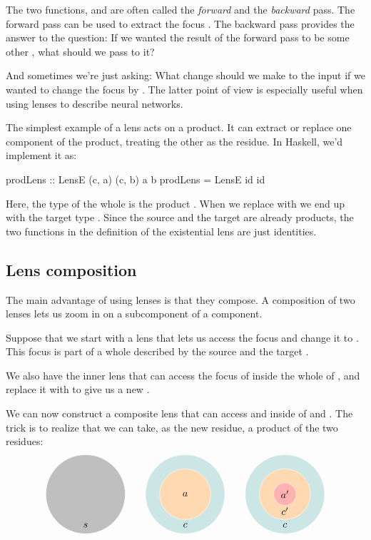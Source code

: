 \documentclass[DaoFP]{subfiles}
\begin{document}
The two functions,  and  are often called the \emph{forward} and the \emph{backward} pass. 
The forward pass can be used to extract the focus . The backward pass provides the answer to the question: If we wanted the result of the forward pass to be some other , what  should we pass to it? 

And sometimes we're just asking: What change  should we make to the input if we wanted to change the focus by . The latter point of view is especially useful when using lenses to describe neural networks.

The simplest example of a lens acts on a product. It can extract or replace one component of the product, treating the other as the residue. In Haskell, we'd implement it as:
\begin{haskell}
prodLens :: LensE (c, a) (c, b) a b
prodLens = LensE id id
\end{haskell}
Here, the type of the whole is the product . When we replace  with  we end up with the target type . Since the source and the target are already products, the two functions in the definition of the existential lens are just identities.

\subsection{Lens composition}

The main advantage of using lenses is that they compose. A composition of two lenses lets us zoom in on a subcomponent of a component. 

Suppose that we start with a lens that lets us access the focus   and change it to . This focus is part of a whole described by the source  and the target . 

We also have the inner lens that can access the focus of   inside the whole of , and replace it with  to give us a new . 

We can now construct a composite lens that can access  and  inside of  and . The trick is to realize that we can take, as the new residue, a product of the two residues:
\[
\begin{tikzpicture}
\filldraw[fill=gray!50, draw=white] (0, 0) circle (1.4);
\node at (0, -1.1) {$s$};
\end{tikzpicture}
\hspace{20pt}
\begin{tikzpicture}
\filldraw[fill=blue!50!green!20, draw=white] (0, 0) circle (1.4);
\filldraw[fill=orange!30, draw=white] (0, 0) circle (0.9);
\node at (0, 0) {$a$};
\node at (0, -1.1) {$c$};
\end{tikzpicture}
\hspace{20pt}
\begin{tikzpicture}
\filldraw[fill=blue!50!green!20, draw=white] (0, 0) circle (1.4);
\filldraw[fill=orange!30, draw=white] (0, 0) circle (0.9);
\filldraw[fill=red!30, draw=white] (0, 0) circle (0.4);
\node at (0, 0) {$a'$};
\node at (0, -0.6) {$c'$};
\node at (0, -1.1) {$c$};
\end{tikzpicture}
\]
\end{document}
